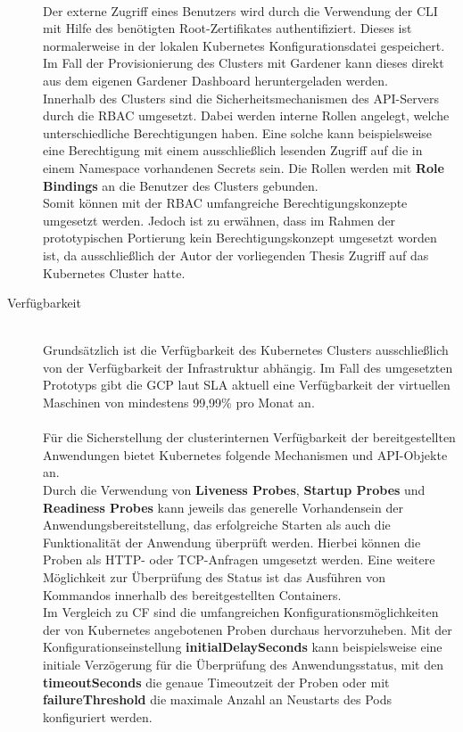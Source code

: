 \begin{description}
\\
Der externe Zugriff eines Benutzers wird durch die Verwendung der \ac{CLI} mit Hilfe des benötigten Root-Zertifikates authentifiziert. Dieses ist normalerweise in der lokalen Kubernetes Konfigurationsdatei gespeichert. Im Fall der Provisionierung des Clusters mit Gardener kann dieses direkt aus dem eigenen Gardener Dashboard heruntergeladen werden.\autocite[Vgl.][]{KubernetesAuthors.20191106}\\
Innerhalb des Clusters sind die Sicherheitsmechanismen des \ac{API}-Servers durch die \ac{RBAC} umgesetzt. Dabei werden interne Rollen angelegt, welche unterschiedliche Berechtigungen haben. Eine solche kann beispielsweise eine Berechtigung mit einem ausschließlich lesenden Zugriff auf die in einem Namespace vorhandenen Secrets sein. Die Rollen werden mit \textbf{Role Bindings} an die Benutzer des Clusters gebunden.\autocite[Vgl.][]{KubernetesAuthors.20191023}\\
Somit können mit der \ac{RBAC} umfangreiche Berechtigungskonzepte umgesetzt werden. Jedoch ist zu erwähnen, dass im Rahmen der prototypischen Portierung kein Berechtigungskonzept umgesetzt worden ist, da ausschließlich der Autor der vorliegenden Thesis Zugriff auf das Kubernetes Cluster hatte.\\
\item[Verfügbarkeit] \hfill \\
Grundsätzlich ist die Verfügbarkeit des Kubernetes Clusters ausschließlich von der Verfügbarkeit der Infrastruktur abhängig. Im Fall des umgesetzten Prototyps gibt die \ac{GCP} laut \ac{SLA} aktuell eine Verfügbarkeit der virtuellen Maschinen von mindestens 99,99\% pro Monat an.\autocite[Vgl.][]{GoogleCloudAuthors.20200113}\\
\\
Für die Sicherstellung der clusterinternen Verfügbarkeit der bereitgestellten Anwendungen bietet Kubernetes folgende Mechanismen und \ac{API}-Objekte an.\\ 
Durch die Verwendung von \textbf{Liveness Probes}, \textbf{Startup Probes} und \textbf{Readiness Probes} kann jeweils das generelle Vorhandensein der Anwendungsbereitstellung, das erfolgreiche Starten als auch die Funktionalität der Anwendung überprüft werden. Hierbei können die Proben als \ac{HTTP}- oder \ac{TCP}-Anfragen umgesetzt werden. Eine weitere Möglichkeit zur Überprüfung des Status ist das Ausführen von Kommandos innerhalb des bereitgestellten Containers.\\
Im Vergleich zu \ac{CF} sind die umfangreichen Konfigurationsmöglichkeiten der von Kubernetes angebotenen Proben durchaus hervorzuheben. Mit der Konfigurationseinstellung \textbf{initialDelaySeconds} kann beispielsweise eine initiale Verzögerung für die Überprüfung des Anwendungsstatus, mit den \textbf{timeoutSeconds} die genaue Timeoutzeit der Proben oder mit \textbf{failureThreshold} die maximale Anzahl an Neustarts des Pods konfiguriert werden.\autocite[Vgl.][]{KubernetesAuthors.20200112}\\

\end{description}
